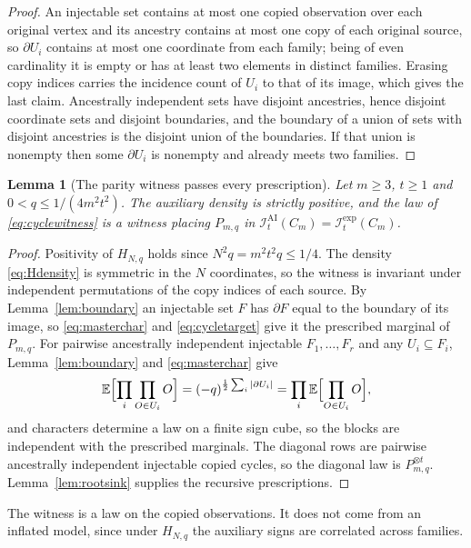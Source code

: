 \documentclass[11pt]{article}
\theoremstyle{plain}
\newtheorem{lemma}[theorem]{Lemma}
\theoremstyle{definition}
\newcommand{\IAI}{\mathcal I^{\mathrm{AI}}}
\newcommand{\Iexp}{\mathcal I^{\mathrm{exp}}}
\newcommand{\E}{\mathbb E}
\begin{document}
\begin{proof}
An injectable set contains at most one copied observation over each original vertex and its ancestry contains at most one copy of each original source, so $\partial U_i$ contains at most one coordinate from each family; being of even cardinality it is empty or has at least two elements in distinct families. Erasing copy indices carries the incidence count of $U_i$ to that of its image, which gives the last claim. Ancestrally independent sets have disjoint ancestries, hence disjoint coordinate sets and disjoint boundaries, and the boundary of a union of sets with disjoint ancestries is the disjoint union of the boundaries. If that union is nonempty then some $\partial U_i$ is nonempty and already meets two families.
\end{proof}

\begin{lemma}[The parity witness passes every prescription]\label{lem:cyclewitness}
Let $m\ge3$, $t\ge1$ and $0<q\le1/(4m^2t^2)$. The auxiliary density is strictly positive, and the law of \eqref{eq:cyclewitness} is a witness placing $P_{m,q}$ in $\IAI_t(C_m)=\Iexp_t(C_m)$.
\end{lemma}

\begin{proof}
Positivity of $H_{N,q}$ holds since $N^2q=m^2t^2q\le1/4$. The density \eqref{eq:Hdensity} is symmetric in the $N$ coordinates, so the witness is invariant under independent permutations of the copy indices of each source. By Lemma~\ref{lem:boundary} an injectable set $F$ has $\partial F$ equal to the boundary of its image, so \eqref{eq:masterchar} and \eqref{eq:cycletarget} give it the prescribed marginal of $P_{m,q}$. For pairwise ancestrally independent injectable $F_1,\dots,F_r$ and any $U_i\subseteq F_i$, Lemma~\ref{lem:boundary} and \eqref{eq:masterchar} give
\[
\E\Bigl[\prod_i\prod_{O\in U_i}O\Bigr]=(-q)^{\frac12\sum_i|\partial U_i|}=\prod_i\E\Bigl[\prod_{O\in U_i}O\Bigr],
\]
and characters determine a law on a finite sign cube, so the blocks are independent with the prescribed marginals. The diagonal rows are pairwise ancestrally independent injectable copied cycles, so the diagonal law is $P_{m,q}^{\otimes t}$. Lemma~\ref{lem:rootsink} supplies the recursive prescriptions.
\end{proof}

The witness is a law on the copied observations. It does not come from an inflated model, since under $H_{N,q}$ the auxiliary signs are correlated across families.
\end{document}

